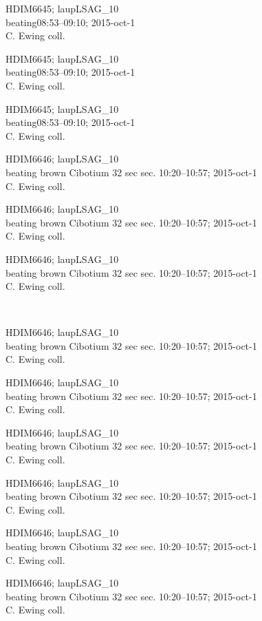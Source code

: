 \documentclass[2pt]{extarticle}
\begin{document}
\noindent
\parbox{0.16\textwidth}{\tiny \raggedright \rule[-0.3\baselineskip]{0pt}{10pt}HDIM6645; laupLSAG\_10\\ beating08:53--09:10; 2015-oct-1\\ C. Ewing coll.}
\parbox{0.16\textwidth}{\tiny \raggedright \rule[-0.3\baselineskip]{0pt}{10pt}HDIM6645; laupLSAG\_10\\ beating08:53--09:10; 2015-oct-1\\ C. Ewing coll.}
\parbox{0.16\textwidth}{\tiny \raggedright \rule[-0.3\baselineskip]{0pt}{10pt}HDIM6645; laupLSAG\_10\\ beating08:53--09:10; 2015-oct-1\\ C. Ewing coll.}
\parbox{0.16\textwidth}{\tiny \raggedright \rule[-0.3\baselineskip]{0pt}{10pt}HDIM6646; laupLSAG\_10\\ beating brown Cibotium 32 sec sec. 10:20--10:57; 2015-oct-1\\ C. Ewing coll.}
\parbox{0.16\textwidth}{\tiny \raggedright \rule[-0.3\baselineskip]{0pt}{10pt}HDIM6646; laupLSAG\_10\\ beating brown Cibotium 32 sec sec. 10:20--10:57; 2015-oct-1\\ C. Ewing coll.}
\parbox{0.16\textwidth}{\tiny \raggedright \rule[-0.3\baselineskip]{0pt}{10pt}HDIM6646; laupLSAG\_10\\ beating brown Cibotium 32 sec sec. 10:20--10:57; 2015-oct-1\\ C. Ewing coll.} \\ 
\vspace{0.001in} 

\noindent
\parbox{0.16\textwidth}{\tiny \raggedright \rule[-0.3\baselineskip]{0pt}{10pt}HDIM6646; laupLSAG\_10\\ beating brown Cibotium 32 sec sec. 10:20--10:57; 2015-oct-1\\ C. Ewing coll.}
\parbox{0.16\textwidth}{\tiny \raggedright \rule[-0.3\baselineskip]{0pt}{10pt}HDIM6646; laupLSAG\_10\\ beating brown Cibotium 32 sec sec. 10:20--10:57; 2015-oct-1\\ C. Ewing coll.}
\parbox{0.16\textwidth}{\tiny \raggedright \rule[-0.3\baselineskip]{0pt}{10pt}HDIM6646; laupLSAG\_10\\ beating brown Cibotium 32 sec sec. 10:20--10:57; 2015-oct-1\\ C. Ewing coll.}
\parbox{0.16\textwidth}{\tiny \raggedright \rule[-0.3\baselineskip]{0pt}{10pt}HDIM6646; laupLSAG\_10\\ beating brown Cibotium 32 sec sec. 10:20--10:57; 2015-oct-1\\ C. Ewing coll.}
\parbox{0.16\textwidth}{\tiny \raggedright \rule[-0.3\baselineskip]{0pt}{10pt}HDIM6646; laupLSAG\_10\\ beating brown Cibotium 32 sec sec. 10:20--10:57; 2015-oct-1\\ C. Ewing coll.}
\parbox{0.16\textwidth}{\tiny \raggedright \rule[-0.3\baselineskip]{0pt}{10pt}HDIM6646; laupLSAG\_10\\ beating brown Cibotium 32 sec sec. 10:20--10:57; 2015-oct-1\\ C. Ewing coll.} \\ 
\vspace{0.001in} 
\end{document}
